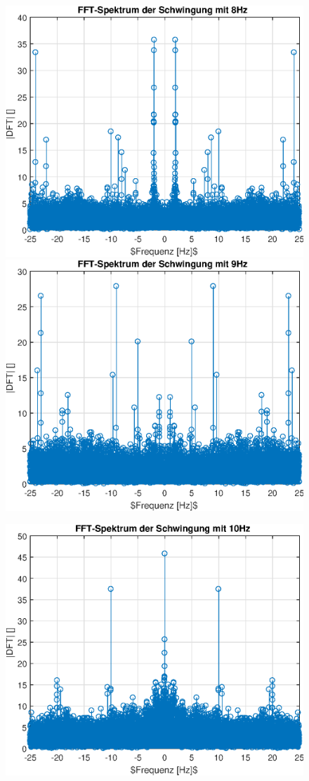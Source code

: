 \documentclass{article}
\begin{document}
\begin{figure}[!h]
\includegraphics[width=0.5\linewidth]{img/dft_sinefreq_8}
\includegraphics[width=0.5\linewidth]{img/dft_sinefreq_9}
\end{figure}
\begin{figure}[!h]
\centering
\includegraphics[width=0.5\linewidth]{img/dft_sinefreq_10}
\end{figure}

\newpage
\end{document}
